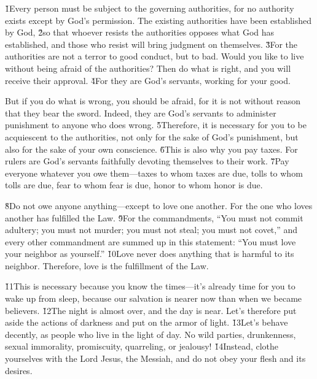 \v{1}Every person must be subject to the governing authorities, for no authority exists except by God's permission. The existing authorities have been established by God, \v{2}so that whoever resists the authorities opposes what God has established, and those who resist will bring judgment on themselves. \v{3}For the authorities are not a terror to good conduct, but to bad. Would you like to live without being afraid of the authorities? Then do what is right, and you will receive their approval. \v{4}For they are God's servants, working for your good.

But if you do what is wrong, you should be afraid, for it is not without reason that they bear the sword. Indeed, they are God's servants to administer punishment to anyone who does wrong. \v{5}Therefore, it is necessary for you to be acquiescent to the authorities, not only for the sake of God's punishment, but also for the sake of your own conscience. \v{6}This is also why you pay taxes. For rulers are God's servants faithfully devoting themselves to their work. \v{7}Pay everyone whatever you owe them---taxes to whom taxes are due, tolls to whom tolls are due, fear to whom fear is due, honor to whom honor is due.

\v{8}Do not owe anyone anything---except to love one another. For the one who loves another has fulfilled the Law. \v{9}For the commandments, ``You must not commit adultery; you must not murder; you must not steal; you must not covet,'' and every other commandment are summed up in this statement: ``You must love your neighbor as yourself.'' \v{10}Love never does anything that is harmful to its neighbor. Therefore, love is the fulfillment of the Law.

\v{11}This is necessary because you know the times---it's already time for you to wake up from sleep, because our salvation is nearer now than when we became believers. \v{12}The night is almost over, and the day is near. Let's therefore put aside the actions of darkness and put on the armor of light. \v{13}Let's behave decently, as people who live in the light of day. No wild parties, drunkenness, sexual immorality, promiscuity, quarreling, or jealousy! \v{14}Instead, clothe yourselves with the Lord Jesus, the Messiah, and do not obey your flesh and its desires.

